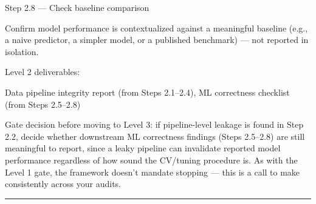 \documentclass[11pt, a4paper]{article}
\begin{document}
Step 2.8 — Check baseline comparison

Confirm model performance is contextualized against a meaningful baseline (e.g., a naive predictor, a simpler model, or a published benchmark) — not reported in isolation.

Level 2 deliverables:

Data pipeline integrity report (from Steps 2.1–2.4),
ML correctness checklist (from Steps 2.5–2.8)

Gate decision before moving to Level 3: if pipeline-level leakage is found in Step 2.2, decide whether downstream ML correctness findings (Steps 2.5–2.8) are still meaningful to report, since a leaky pipeline can invalidate reported model performance regardless of how sound the CV/tuning procedure is. As with the Level 1 gate, the framework doesn't mandate stopping — this is a call to make consistently across your audits.

\vspace{.3cm}
\rule{\textwidth}{0.3pt}
\end{document}
